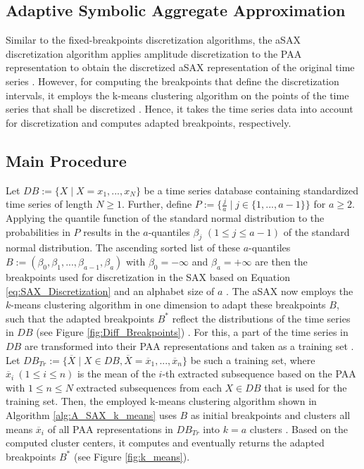 \subsection{Adaptive Symbolic Aggregate Approximation}
Similar to the fixed-breakpoints discretization algorithms, the \ac{aSAX} discretization algorithm applies amplitude discretization to the \ac{PAA} representation to obtain the discretized \ac{aSAX} representation of the original time series \cite{A_SAX}. However, for computing the breakpoints that define the discretization intervals, it employs the k-means clustering algorithm on the points of the time series that shall be discretized \cite{A_SAX}. Hence, it takes the time series data into account for discretization and computes adapted breakpoints, respectively.
\subsection*{Main Procedure}
Let $DB := \{X \mid X = x_1, ..., x_N \}$ be a time series database containing standardized time series of length $N \geq 1$. Further, define $P := \{\frac{j}{a} \mid j \in \{1, ..., a-1\}\}$ for $a \geq 2$. Applying the quantile function of the standard normal distribution to the probabilities in $P$ results in the $a$-quantiles $\beta_j$ $(1 \leq j \leq a-1)$ of the standard normal distribution. The ascending sorted list of these $a$-quantiles $B := (\beta_0, \beta_1, ..., \beta_{a-1}, \beta_a)$ with $\beta_0 = -\infty$ and $\beta_a = +\infty$ are then the breakpoints used for discretization in the \ac{SAX} based on Equation \ref{eq:SAX_Discretization} and an alphabet size of $a$ \cite{SAX_Lin_first}. \newline
The \ac{aSAX} now employs the $k$-means clustering algorithm in one dimension to adapt these breakpoints $B$, such that the adapted breakpoints $B^*$ reflect the distributions of the time series in $DB$ (see Figure \ref{fig:Diff_Breakpoints}) \cite{A_SAX}. For this, a part of the time series in $DB$ are transformed into their \ac{PAA} representations and taken as a training set \cite{A_SAX}. Let $DB_{Tr} := \{\overline{X} \mid X \in DB, \overline{X} = \overline{x}_1, ..., \overline{x}_n \}$ be such a training set, where $\overline{x}_i \ (1 \leq i \leq n)$ is the mean of the $i$-th extracted subsequence based on the \ac{PAA} with $1 \leq n \leq N$ extracted subsequences from each $X \in DB$ that is used for the training set. Then, the employed k-means clustering algorithm shown in Algorithm \ref{alg:A_SAX_k_means} uses $B$ as initial breakpoints and clusters all means $\overline{x}_i$ of all \ac{PAA} representations in $DB_{Tr}$ into $k = a$ clusters \cite{A_SAX}. Based on the computed cluster centers, it computes and eventually returns the adapted breakpoints $B^*$ (see Figure \ref{fig:k_means}). \newline
